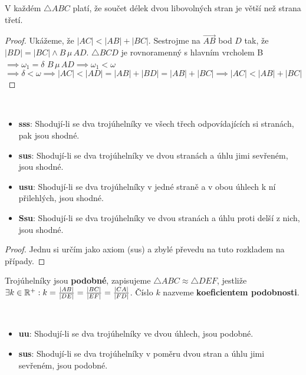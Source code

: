 \begin{veta}
  V každém $\triangle ABC$ platí, že součet délek dvou libovolných stran je větší než strana třetí.
\end{veta}

\begin{proof}
  Ukážeme, že $|AC| < |AB| + |BC|$. Sestrojme na $\overrightarrow{AB}$ bod $D$ tak, že $|BD| = |BC| \land B\, \mu\, AD$. $\triangle BCD$ je rovnoramenný s hlavním vrcholem B $\implies \omega_1 = \delta$
  $B\, \mu\, AD \implies \omega_1 < \omega$
  $\implies \delta < \omega \implies |AC| < |AD| = |AB| + |BD| = |AB| + |BC| \implies |AC| < |AB| + |BC|$
\end{proof}

\begin{veta}
  \,

  \begin{itemize}
    \item \textbf{sss}: Shodují-li se dva trojúhelníky ve všech třech odpovídajících si stranách, pak jsou shodné.
    \item \textbf{sus}: Shodují-li se dva trojúhelníky ve dvou stranách a úhlu jimi sevřeném, jsou shodné.
    \item \textbf{usu}: Shodují-li se dva trojúhelníky v jedné straně a v obou úhlech k ní přilehlých, jsou shodné.
    \item \textbf{Ssu}: Shodují-li se dva trojúhelníky ve dvou stranách a úhlu proti delší z nich, jsou shodné.
  \end{itemize}
\end{veta}

\begin{proof}
  Jednu si určím jako axiom (sus) a zbylé převedu na tuto rozkladem na případy.
\end{proof}

\begin{definition}
  Trojúhelníky jsou \textbf{podobné}, zapisujeme $\triangle ABC \approx \triangle DEF$, jestliže $\exists k \in \mathbb{R}^+:k = \frac{|AB|}{|DE|}=\frac{|BC|}{|EF|}=\frac{|CA|}{|FD|}$. Číslo $k$ nazveme \textbf{koeficientem podobnosti}.
\end{definition}

\begin{veta}
  \,

  \begin{itemize}
    \item \textbf{uu}: Shodují-li se dva trojúhelníky ve dvou úhlech, jsou podobné.
    \item \textbf{sus}: Shodují-li se dva trojúhelníky v poměru dvou stran a úhlu jimi sevřeném, jsou podobné.
  \end{itemize}
\end{veta}

